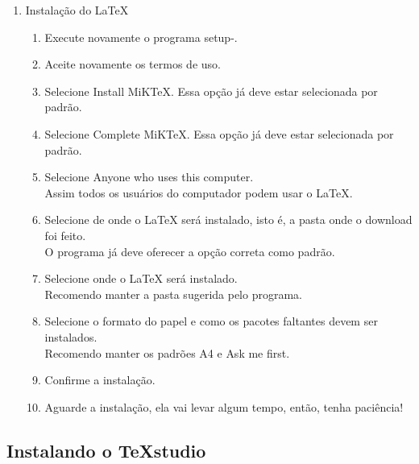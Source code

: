 \documentclass[fleqn]{profmat-cefet}
\newcommand{\TeXstudio}{\TeX\textsf{studio}}
\begin{document}
\begin{enumerate}
\begin{enumerate}
        \item Aguarde o download. Vai demorar um pouco, pois você está baixando o \LaTeX{} com todos seus pacotes.
        \item Quando o download terminar, finalize o programa clicando em avançar .
    \end{enumerate}
    \item Instalação do \LaTeX{}
    \begin{enumerate}
        \item Execute novamente o programa \textsf{setup-\miktexversion{}}.
        \item Aceite novamente os termos de uso.
        \item Selecione \textsf{Install MiKTeX}.  Essa opção já deve estar selecionada por padrão.
        \item Selecione \textsf{Complete MiKTeX}. Essa opção já deve estar selecionada por padrão.
        \item Selecione \textsf{Anyone who uses this computer}. \\
        Assim todos os usuários do computador podem usar o \LaTeX{}.
        \item Selecione de onde o \LaTeX{} será instalado, isto é, a pasta onde o download foi feito. \\
        O programa já deve oferecer a opção correta como padrão.
        \item Selecione onde o \LaTeX{} será instalado. \\
        Recomendo manter a pasta sugerida pelo programa.
        \item Selecione o formato do papel e como os pacotes faltantes devem ser instalados. \\
        Recomendo manter os padrões A4 e \textsf{Ask me first}.
        \item Confirme a instalação.
        \item Aguarde a instalação, ela vai levar algum tempo, então, tenha paciência!
    \end{enumerate}
\end{enumerate}

\subsection{Instalando o \TeXstudio{}}
\end{document}
